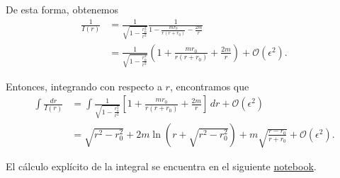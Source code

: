 \documentclass[letterpaper,11pt]{article}
\begin{document}
De esta forma, obtenemos
\begin{align}
\frac{1}{I(r)} &= \frac{1}{\sqrt{1 - \frac{r_0^2}{r^2}}} \frac{1}{1 - \frac{mr_0}{r(r + r_0)} - \frac{2m}{r}} \nonumber\\
&= \frac{1}{\sqrt{1 - \frac{r_0^2}{r^2}}} \left(1 + \frac{mr_0}{r(r+r_0)} + \frac{2m}{r}\right) + \mathcal{O}(\epsilon^2).
\end{align}

Entonces, integrando con respecto a $r$, encontramos que
\begin{align}
\int \frac{dr}{I(r)} &= \int \frac{1}{\sqrt{1 - \frac{r_0^2}{r^2}}} \left[1 + \frac{mr_0}{r(r + r_0)} + \frac{2m}{r}\right] \,dr + \mathcal{O}(\epsilon^2) \nonumber\\
&= \sqrt{r^2 - r_0^2} + 2m \ln\left(r + \sqrt{r^2 - r_0^2}\right) + m \sqrt{\frac{r-r_0}{r + r_0}} + \mathcal{O}(\epsilon^2).
\end{align}

El cálculo explícito de la integral se encuentra en el siguiente \href{https://github.com/AleSaa66/Topicos-RG/blob/main/Semana%208/Semana-8.ipynb}{notebook}.
\end{document}

